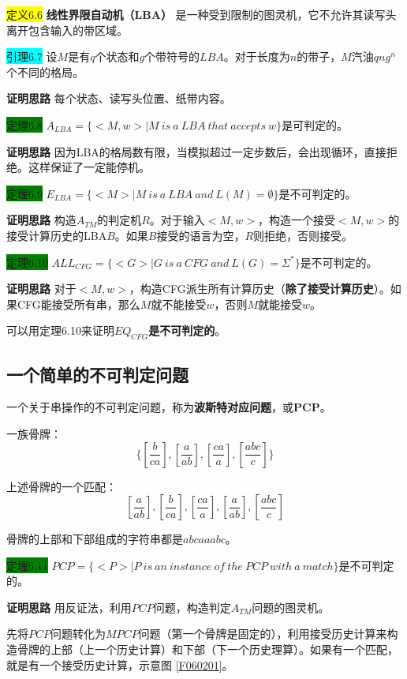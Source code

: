 \documentclass[a4paper]{article}
\begin{document}
	\colorbox{yellow}{定义6.6} \textbf{线性界限自动机（LBA）} 是一种受到限制的图灵机，它不允许其读写头离开包含输入的带区域。
	
	\colorbox{cyan}{引理6.7} 设$M$是有$q$个状态和$g$个带符号的$LBA$。对于长度为$n$的带子，$M$汽油$qng^n$个不同的格局。
	
	\textbf{证明思路} \quad 每个状态、读写头位置、纸带内容。
	
	\colorbox{green}{定理6.8} $A_{LBA}=\{<M,w>|M~is~a~LBA~that~accepts~w\}$是可判定的。

	\textbf{证明思路} \quad 因为LBA的格局数有限，当模拟超过一定步数后，会出现循环，直接拒绝。这样保证了一定能停机。
	
	\colorbox{green}{定理6.9} $E_{LBA}=\{<M>|M~is~a~LBA~and~L(M)=\emptyset\}$是不可判定的。
	
	\textbf{证明思路} \quad 构造$A_{TM}$的判定机$R$。对于输入$<M,w>$，构造一个接受$<M,w>$的接受计算历史的LBA$B$。如果$B$接受的语言为空，$R$则拒绝，否则接受。

	\colorbox{green}{定理6.10} $ALL_{CFG}=\{<G>|G~is~a~CFG~and~L(G)=\Sigma^*\}$是不可判定的。
	
	\textbf{证明思路} \quad 对于$<M,w>$，构造CFG派生所有计算历史（\textbf{除了接受计算历史}）。如果CFG能接受所有串，那么$M$就不能接受$w$，否则$M$就能接受$w$。

	可以用定理6.10来证明\textbf{$EQ_{CFG}$是不可判定的}。

\subsection{一个简单的不可判定问题}

	一个关于串操作的不可判定问题，称为\textbf{波斯特对应问题}，或\textbf{PCP}。
	
	一族骨牌：
	$$\{[\frac{b}{ca}],[\frac{a}{ab}],[\frac{ca}{a}],[\frac{abc}{c}]\}$$
	
	上述骨牌的一个匹配：
	$$[\frac{a}{ab}],[\frac{b}{ca}],[\frac{ca}{a}],[\frac{a}{ab}],[\frac{abc}{c}]$$
	
	骨牌的上部和下部组成的字符串都是$abcaaabc$。

	\colorbox{green}{定理6.11} $PCP=\{<P>|P~is~an~instance~of~the~PCP~with~a~match\}$是不可判定的。
	
	\textbf{证明思路} \quad 用反证法，利用$PCP$问题，构造判定$A_{TM}$问题的图灵机。
	
	先将$PCP$问题转化为$MPCP$问题（第一个骨牌是固定的），利用接受历史计算来构造骨牌的上部（上一个历史计算）和下部（下一个历史理算）。如果有一个匹配，就是有一个接受历史计算，示意图 \ref{F060201}。
\end{document}
